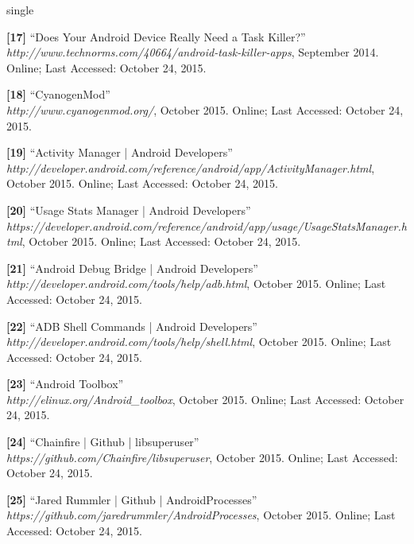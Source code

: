 \documentclass[12pt]{uthesis-v12}  %
\begin{document}
\begin{referencelist}{single}
	\item \textbf{[17]} ``Does Your Android Device Really Need a Task Killer?''
	\\\emph{http://www.technorms.com/40664/android-task-killer-apps}, September 2014. 
	Online; Last Accessed: October 24, 2015.
											
	\item \textbf{[18]} ``CyanogenMod''
	\\\emph{http://www.cyanogenmod.org/}, October 2015. 
	Online; Last Accessed: October 24, 2015.
											
	\item \textbf{[19]} ``Activity Manager | Android Developers''
	\\\emph{http://developer.android.com/reference/android/app/ActivityManager.html}, October 2015. 
	Online; Last Accessed: October 24, 2015.
	
	\item \textbf{[20]} ``Usage Stats Manager | Android Developers''
	\\\emph{https://developer.android.com/reference/android/app/usage/UsageStatsManager.html}, October 2015. 
	Online; Last Accessed: October 24, 2015.																			

	\item \textbf{[21]} ``Android Debug Bridge | Android Developers''
	\\\emph{http://developer.android.com/tools/help/adb.html}, October 2015. 
	Online; Last Accessed: October 24, 2015.

	\item \textbf{[22]} ``ADB Shell Commands | Android Developers''
	\\\emph{http://developer.android.com/tools/help/shell.html}, October 2015. 
	Online; Last Accessed: October 24, 2015.
	
	\item \textbf{[23]} ``Android Toolbox''
	\\\emph{http://elinux.org/Android\_toolbox}, October 2015. 
	Online; Last Accessed: October 24, 2015.
	
	\item \textbf{[24]} ``Chainfire | Github | libsuperuser''
	\\\emph{https://github.com/Chainfire/libsuperuser}, October 2015. 
	Online; Last Accessed: October 24, 2015.
	
	\item \textbf{[25]} ``Jared Rummler | Github | AndroidProcesses''
	\\\emph{https://github.com/jaredrummler/AndroidProcesses}, October 2015. 
	Online; Last Accessed: October 24, 2015.


\end{referencelist}
\end{document}
